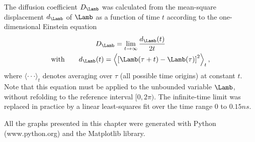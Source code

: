 The diffusion coefficient $D_{\Lamb}$ was calculated from the mean-square displacement $d_{\Lamb}$ of $\Lamb$ as a function of time $t$ according to the one-dimensional Einstein equation\cite{EI05.1}
%
\begin{multline}
  \label{eq:einstein}
  D_{\Lamb}=\lim\limits_{t\rightarrow \infty} \frac{d_{\Lamb}(t)}{2t} \\
  \text{with} \qquad d_{\Lamb}(t)=\left \langle \left[\Lamb(\tau + t) -\Lamb (\tau)\right ]^2 \right \rangle_{t},
\end{multline}
%
where $\langle \cdot\cdot\cdot \rangle_{t}$ denotes averaging over $\tau$ (all possible time origins) at constant $t$. Note that this equation must be applied to the unbounded variable $\Lamb$, \ie{}  without refolding to the reference interval $[0,2\pi)$.
The infinite-time limit was replaced in practice by a linear least-squares fit over the time range 0 to $0.15\unit{ns}$.
%


%


All the graphs presented in this chapter were generated with Python (www.python.org) and the Matplotlib library.\cite{HU07.7}

